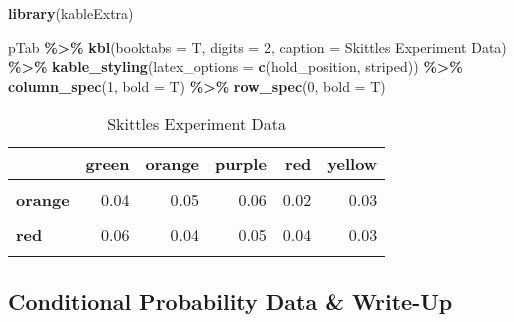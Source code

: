\documentclass[
]{article}
\newenvironment{Shaded}{\begin{snugshade}}{\end{snugshade}}
\newcommand{\AttributeTok}[1]{\textcolor[rgb]{0.13,0.29,0.53}{#1}}
\newcommand{\DecValTok}[1]{\textcolor[rgb]{0.00,0.00,0.81}{#1}}
\newcommand{\FunctionTok}[1]{\textcolor[rgb]{0.13,0.29,0.53}{\textbf{#1}}}
\newcommand{\NormalTok}[1]{#1}
\newcommand{\SpecialCharTok}[1]{\textcolor[rgb]{0.81,0.36,0.00}{\textbf{#1}}}
\newcommand{\StringTok}[1]{\textcolor[rgb]{0.31,0.60,0.02}{#1}}
\begin{document}
\begin{Shaded}
\begin{Highlighting}[]
\FunctionTok{library}\NormalTok{(kableExtra)}

\NormalTok{pTab }\SpecialCharTok{\%\textgreater{}\%}
  \FunctionTok{kbl}\NormalTok{(}\AttributeTok{booktabs =}\NormalTok{ T, }\AttributeTok{digits =} \DecValTok{2}\NormalTok{, }\AttributeTok{caption =} \StringTok{\textquotesingle{}Skittles Experiment Data\textquotesingle{}}\NormalTok{) }\SpecialCharTok{\%\textgreater{}\%}
  \FunctionTok{kable\_styling}\NormalTok{(}\AttributeTok{latex\_options =} \FunctionTok{c}\NormalTok{(}\StringTok{\textquotesingle{}hold\_position\textquotesingle{}}\NormalTok{, }\StringTok{\textquotesingle{}striped\textquotesingle{}}\NormalTok{)) }\SpecialCharTok{\%\textgreater{}\%}
  \FunctionTok{column\_spec}\NormalTok{(}\DecValTok{1}\NormalTok{, }\AttributeTok{bold =}\NormalTok{ T) }\SpecialCharTok{\%\textgreater{}\%}
  \FunctionTok{row\_spec}\NormalTok{(}\DecValTok{0}\NormalTok{, }\AttributeTok{bold =}\NormalTok{ T)}
\end{Highlighting}
\end{Shaded}

\begin{table}[!h]

\caption{\label{tab:unnamed-chunk-12}Skittles Experiment Data}
\centering
\begin{tabular}[t]{>{}lrrrrr}
\toprule
\textbf{ } & \textbf{green} & \textbf{orange} & \textbf{purple} & \textbf{red} & \textbf{yellow}\\
\midrule
\textbf{\cellcolor{gray!6}{green}} & \cellcolor{gray!6}{0.01} & \cellcolor{gray!6}{0.05} & \cellcolor{gray!6}{0.01} & \cellcolor{gray!6}{0.05} & \cellcolor{gray!6}{0.06}\\
\textbf{orange} & 0.04 & 0.05 & 0.06 & 0.02 & 0.03\\
\textbf{\cellcolor{gray!6}{purple}} & \cellcolor{gray!6}{0.03} & \cellcolor{gray!6}{0.08} & \cellcolor{gray!6}{0.06} & \cellcolor{gray!6}{0.02} & \cellcolor{gray!6}{0.02}\\
\textbf{red} & 0.06 & 0.04 & 0.05 & 0.04 & 0.03\\
\textbf{\cellcolor{gray!6}{yellow}} & \cellcolor{gray!6}{0.06} & \cellcolor{gray!6}{0.06} & \cellcolor{gray!6}{0.03} & \cellcolor{gray!6}{0.03} & \cellcolor{gray!6}{0.01}\\
\bottomrule
\end{tabular}
\end{table}

\hypertarget{conditional-probability-data-write-up}{%
\subsection{Conditional Probability Data \&
Write-Up}\label{conditional-probability-data-write-up}}
\end{document}
